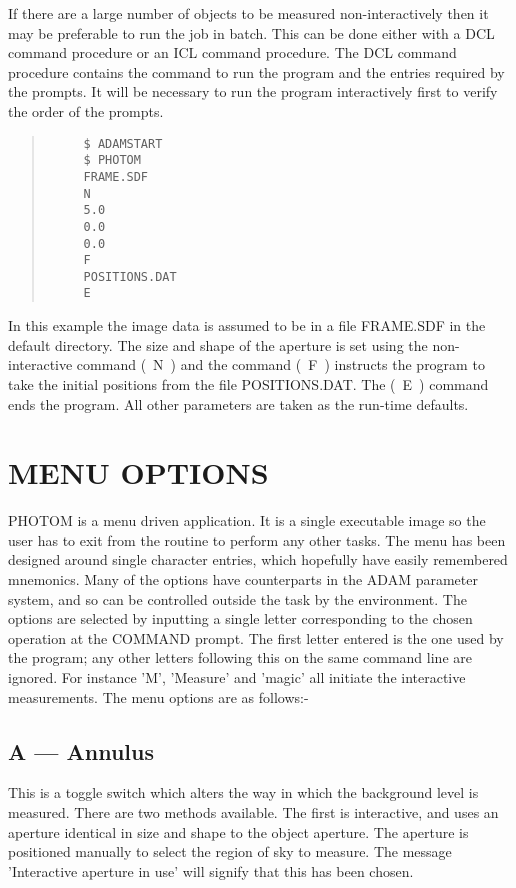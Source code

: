If there are a large number of objects to be measured non-interactively
then it may be preferable to run the job in batch. This can be done
either with a DCL command procedure or an ICL command procedure.
The DCL command procedure contains the command to run the program and
the entries required by the prompts. It will be necessary to run the
program interactively first to verify the order of the prompts.
\begin{quote}
\begin{verbatim}
     $ ADAMSTART
     $ PHOTOM
     FRAME.SDF
     N
     5.0
     0.0
     0.0
     F
     POSITIONS.DAT
     E
\end{verbatim}
\end{quote}
In this example the image data is assumed to be in a file FRAME.SDF in
the default directory. The size and shape of the aperture is set using
the non-interactive command (~N~) and the command (~F~) instructs the
program to take the initial positions from the file POSITIONS.DAT. The
(~E~) command ends the program. All other parameters are taken as the
run-time defaults.


\section{MENU OPTIONS}

PHOTOM is a menu driven application. It is a single executable image so
the user has to exit from the routine to perform any other tasks. The
menu has been designed around single character entries, which hopefully
have easily remembered mnemonics. Many of the options have counterparts
in the ADAM parameter system, and so can be controlled outside the task
by the environment. The options are selected by inputting a single
letter corresponding to the chosen operation at the COMMAND prompt.
The first letter entered is the one used by the program; any
other letters following this on the same command line are ignored.
For instance 'M', 'Measure' and 'magic' all initiate the interactive
measurements. The menu options are as follows:-

\subsection{A --- Annulus}

This is a toggle switch which alters the way in which the background
level is measured. There are two methods available. The first is
interactive, and uses an aperture identical in size and shape to the
object aperture. The aperture is positioned manually to select the
region of sky to measure. The message 'Interactive aperture in use'
will signify that this has been chosen.

